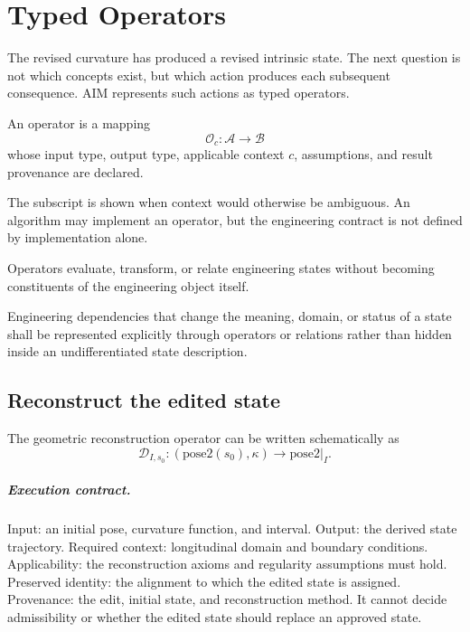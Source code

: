 
\chapter{Typed Operators}
\label{chap:operators}

The revised curvature has produced a revised intrinsic state. The next
question is not which concepts exist, but which action produces each
subsequent consequence. AIM represents such actions as typed operators.

\begin{definition}[Operator]
\label{def:operator}
An operator is a mapping
\[
\mathcal O_c:\mathcal A\rightarrow\mathcal B
\]
whose input type, output type, applicable context \(c\), assumptions,
and result provenance are declared.
\end{definition}

The subscript is shown when context would otherwise be ambiguous. An
algorithm may implement an operator, but the engineering contract is not
defined by implementation alone.

\begin{principle}
\label{princ:state-operator-relation}
Operators evaluate, transform, or relate engineering states without
becoming constituents of the engineering object itself.
\end{principle}

\begin{proposition}
\label{prop:operator-explicit-dependencies}
Engineering dependencies that change the meaning, domain, or status of a
state shall be represented explicitly through operators or relations
rather than hidden inside an undifferentiated state description.
\end{proposition}

\section{Reconstruct the edited state}

The geometric reconstruction operator can be written schematically as
\[
\mathcal D_{I,s_0}:
(\mathrm{pose2}(s_0),\kappa)
\longrightarrow \mathrm{pose2}|_I.
\]

\paragraph{Execution contract.}
Input: an initial pose, curvature function, and interval. Output: the
derived state trajectory. Required context: longitudinal domain and
boundary conditions. Applicability: the reconstruction axioms and
regularity assumptions must hold. Preserved identity: the alignment to
which the edited state is assigned. Provenance: the edit, initial state,
and reconstruction method. It cannot decide admissibility or whether
the edited state should replace an approved state.

